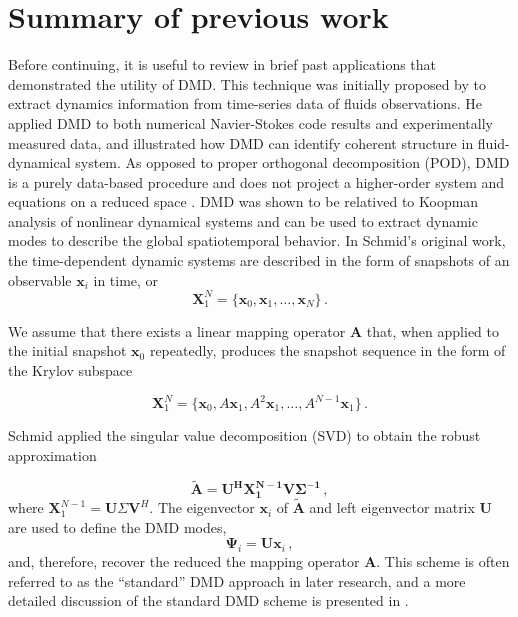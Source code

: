 \section{Summary of previous work}
Before continuing, it is useful to review in brief past applications that demonstrated the utility of DMD.
This technique was initially proposed by \citet{schmid_dynamic_2010}\cite{schmid_applications_2011} to extract dynamics information from time-series data of fluids observations.
He applied DMD to both numerical Navier-Stokes code results and experimentally measured data, and illustrated how DMD can identify coherent structure in fluid-dynamical system.
As opposed to proper orthogonal decomposition (POD)\cite{lumley2007stochastic}, DMD is a purely data-based procedure and does not project a higher-order system and equations on a reduced space . 
DMD was shown to be relatived to Koopman analysis\cite{lasota2013chaos,mezic2005spectral} of nonlinear dynamical systems and can be used to extract dynamic modes to describe the global spatiotemporal behavior.
In Schmid's original work, the time-dependent dynamic systems are described in the form of snapshots of an observable $\mathbf{x}_i$ in time, or
\begin{equation}
 \mathbf{X}^{N}_1 = \{\mathbf{x}_0, \mathbf{x}_1, \ldots, \mathbf{x}_{N} \} \, .
 \label{eq:snap_matrix}
\end{equation}

We assume that there exists a linear mapping operator $\mathbf{A}$ that, when applied to the initial snapshot $\mathbf{x}_0$ repeatedly, produces the snapshot sequence  in the form of the Krylov subspace 

\begin{equation}
 \mathbf{X}^{N}_1 = \{\mathbf{x}_0,A\mathbf{x}_1,A^2\mathbf{x}_1,…,A^{N-1}\mathbf{x}_1 \} \, .
 \label{eq:Krylov_seq}
\end{equation}

Schmid applied the singular value decomposition (SVD) to obtain the robust approximation

\begin{equation}
\mathbf{\tilde{A}} = \mathbf{U^H X_1^{N-1}V\Sigma^{-1}} \, ,
 \label{eq:stanard_DMD}
\end{equation}
where $\mathbf{X}_1^{N-1} = \mathbf{U}\Sigma \mathbf{V}^H$. 
The eigenvector $\mathbf{x}_i$ of $\mathbf{\tilde{A}}$ and left eigenvector matrix $\mathbf{U}$ are used to define the DMD modes, 
\begin{equation}
\mathbf{\mathbf{\Psi}}_i = \mathbf{U} \mathbf{x}_i \, ,
 \label{eq:dyanmic_modes}
\end{equation}
and, therefore, recover the reduced the mapping operator $\mathbf{A}$.
This scheme is often referred to as the ``standard'' DMD approach in later research\cite{tu_dynamic_2014}, and a more detailed discussion of the standard DMD scheme is presented in .   

